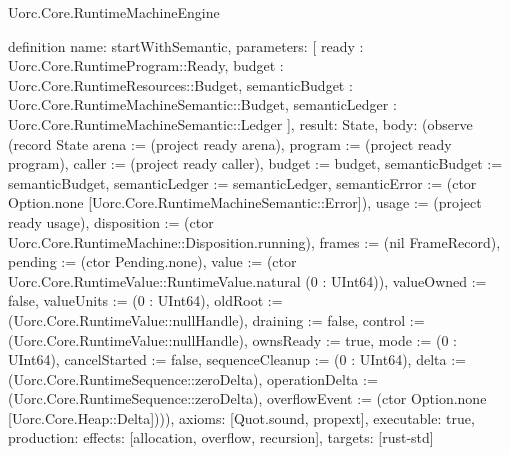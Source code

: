 \begin{lexlean}{Uorc.Core.RuntimeMachineEngine}
\begin{semanticmodule}
definition{
  name: startWithSemantic,
  parameters: [
    ready : Uorc.Core.RuntimeProgram::Ready,
    budget : Uorc.Core.RuntimeResources::Budget,
    semanticBudget : Uorc.Core.RuntimeMachineSemantic::Budget,
    semanticLedger : Uorc.Core.RuntimeMachineSemantic::Ledger
  ],
  result: State,
  body: (observe (record State {arena := (project ready arena), program := (project ready program), caller := (project ready caller), budget := budget, semanticBudget := semanticBudget, semanticLedger := semanticLedger, semanticError := (ctor Option.none [Uorc.Core.RuntimeMachineSemantic::Error]), usage := (project ready usage), disposition := (ctor Uorc.Core.RuntimeMachine::Disposition.running), frames := (nil FrameRecord), pending := (ctor Pending.none), value := (ctor Uorc.Core.RuntimeValue::RuntimeValue.natural (0 : UInt64)), valueOwned := false, valueUnits := (0 : UInt64), oldRoot := (Uorc.Core.RuntimeValue::nullHandle), draining := false, control := (Uorc.Core.RuntimeValue::nullHandle), ownsReady := true, mode := (0 : UInt64), cancelStarted := false, sequenceCleanup := (0 : UInt64), delta := (Uorc.Core.RuntimeSequence::zeroDelta), operationDelta := (Uorc.Core.RuntimeSequence::zeroDelta), overflowEvent := (ctor Option.none [Uorc.Core.Heap::Delta])})),
  axioms: [Quot.sound, propext],
  executable: true,
  production: {effects: [allocation, overflow, recursion], targets: [rust-std]}
}


\end{semanticmodule}
\end{lexlean}
